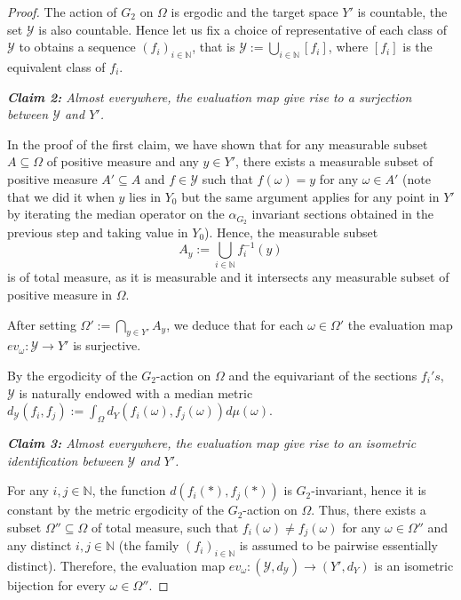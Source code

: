 \documentclass[10pt,a4paper]{amsart}
\newcommand{\NN}{\mathbb{N}}      %
\newcommand{\YY}{\mathcal{Y}}     %
\begin{document}
\begin{proof}
 \par
 The action of $G_2$ on $\Omega$ is ergodic and the target space $Y'$ is countable, the set $\YY$ is also countable. Hence let us fix a choice of representative of each class of $\YY$ to obtains a sequence $(f_i)_{i\in\NN}$, that is $\YY:=\displaystyle{\bigcup_{i\in\NN}[f_i]}$, where $[f_i]$ is the equivalent class of $f_i$.\par 
  \textit{\textbf{Claim 2:} Almost everywhere, the evaluation map give rise to a surjection between $\YY$ and $Y'$.}\par
  In the proof of the first claim, we have shown that for any measurable subset $A\subseteq \Omega$ of positive measure and any $y\in Y'$, there exists a measurable subset of positive measure $A'\subseteq A$ and $f\in \YY$ such that $f(\omega)=y$ for any $\omega\in A'$ (note that we did it when $y$ lies in $Y_0$ but the same argument applies for any point in $Y'$ by iterating the median operator on the $\alpha_{G_2}$ invariant sections obtained in the previous step and taking value in $Y_0$). Hence, the measurable subset 
  \[
  A_y:=\bigcup_{i\in\NN}f_i^{-1}(y)
  \]
 is of total measure, as it is measurable and it intersects any measurable subset of positive measure in $\Omega$.\par 
 After setting $\Omega':=\displaystyle{\bigcap_{y\in Y'}A_y}$, we deduce that for each $\omega\in \Omega'$ the evaluation map $ev_\omega:\YY\rightarrow Y'$ is surjective.\par 
 By the ergodicity of the $G_2$-action on $\Omega$ and the equivariant of the sections $f_i's$, $\YY$ is naturally endowed with a median metric $d_\YY(f_i,f_j):=\int_{\Omega}d_Y(f_i(\omega),f_j(\omega))d\mu(\omega)$. \par 
 
\textit{\textbf{Claim 3:} Almost everywhere, the evaluation map give rise to an isometric identification between $\YY$ and $Y'$.}\par 
For any $i,j\in\NN$, the function $d(f_i(*),f_j(*))$ is $G_2$-invariant, hence it is constant by the metric ergodicity of the $G_2$-action on $\Omega$. Thus, there exists a subset $\Omega''\subseteq \Omega$ of total measure, such that $f_i(\omega)\neq f_j(\omega)$ for any $\omega\in\Omega''$ and any distinct $i,j\in\NN$ (the family $(f_i)_{i\in\NN}$ is assumed to be pairwise essentially distinct). Therefore, the evaluation map $ev_\omega:(\YY,d_\YY)\rightarrow (Y',d_Y)$ is an isometric bijection for every $\omega\in \Omega''$.\par 


\end{proof}
\end{document}
